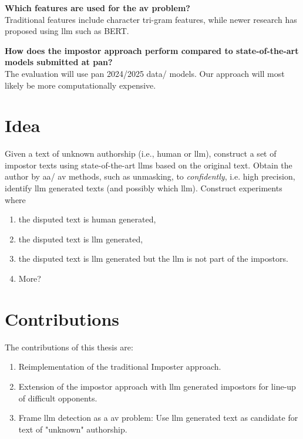 \begin{questions}
    \item \textbf{Which features are used for the \ac{av} problem?} \label{enum:rq3} \hfill \\
    Traditional features include character tri-gram features, while newer research has proposed using \ac{llm} such as BERT.

    \item \textbf{How does the impostor approach perform compared to state-of-the-art models submitted at \ac{pan}?} \label{enum:rq4} \hfill \\
    The evaluation will use \ac{pan} 2024/2025 data/ models.
    Our approach will most likely be more computationally expensive.
\end{questions}

\section*{Idea}
\label{sec:idea}

Given a text of unknown authorship (i.e., human or \ac{llm}), 
construct a set of impostor texts using state-of-the-art \acp{llm} based on the original text.
Obtain the author by \ac{aa}/ \ac{av} methods, such as unmasking, to \textit{confidently}, i.e. high precision, identify \ac{llm} generated texts
(and possibly which \ac{llm}).
Construct experiments where
\begin{enumerate}
    \item the disputed text is human generated,
    \item the disputed text is \ac{llm} generated,
    \item the disputed text is \ac{llm} generated but the \ac{llm} is not part of the impostors.
    \item More?
\end{enumerate}


\section*{Contributions}
\label{sec:contributions}
The contributions of this thesis are:
\begin{enumerate}
    \item Reimplementation of the traditional Imposter approach.
    \item Extension of the impostor approach with \ac{llm} generated impostors for line-up of difficult opponents. 
    \item Frame \ac{llm} detection as a \ac{av} problem: Use \ac{llm} generated text as candidate for text of "unknown" authorship.
\end{enumerate}
